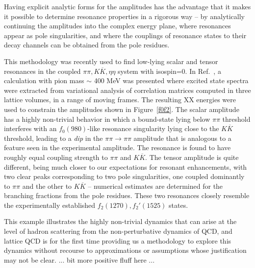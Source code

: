 {Having explicit analytic forms for the amplitudes has the advantage that it makes it possible to determine resonance properties in a rigorous way -- by analytically continuing the amplitudes into the complex energy plane, where resonances appear as pole singularities, and where the couplings of resonance states to their decay channels can be obtained from the pole residues.

This methodology was recently used to find low-lying scalar and tensor resonances in the coupled $\pi\pi, K\overline{K}, \eta\eta$ system with isospin=0. In Ref.~\cite{Briceno:2017qmb}, a calculation with pion mass $\sim$ 400 MeV was presented where excited state spectra were extracted from variational analysis of correlation matrices computed in three lattice volumes, in a range of moving frames. The resulting XX energies were used to constrain the amplitudes shown in Figure~\ref{f0f2}. The scalar amplitude has a highly non-trivial behavior in which a bound-state lying below $\pi\pi$ threshold interferes with an $f_0(980)$-like resonance singularity lying close to the $K\overline{K}$ threshold, leading to a \emph{dip} in the $\pi\pi \to \pi \pi$ amplitude that is analogous to a feature seen in the experimental amplitude. The resonance is found to have roughly equal coupling strength to $\pi\pi$ and $K\overline{K}$. The tensor amplitude is quite different, being much closer to our expectations for resonant enhancements, with two clear peaks corresponding to two pole singularities, one coupled dominantly to $\pi\pi$ and the other to $K\overline{K}$ -- numerical estimates are determined for the branching fractions from the pole residues. These two resonances closely resemble the experimentally established $f_2(1270), f_2'(1525)$ states.

This example illustrates the highly non-trivial dynamics that can arise at the level of hadron scattering from the non-perturbative dynamics of QCD, and lattice QCD is for the first time providing us a methodology to explore this dynamics without recourse to approximations or assumptions whose justification may not be clear. {\color{red} ... bit more positive fluff here ...} 


}
